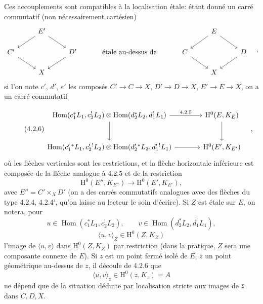 \documentclass[11pt]{article}
\renewcommand{\H}{\mathrm{H}}
\DeclareMathOperator{\Hom}{Hom}
\providecommand{\Hom}{\operatorname{Hom}}
\providecommand{\Hom}{\operatorname{Hom}}
\begin{document}
Ces accouplements sont compatibles à la localisation étale: étant donné un carré commutatif (non nécessairement cartésien)
\[
\begin{tikzcd}[column sep=2.5em,row sep=1.5em]
& E' \arrow[dl] \arrow[dr] & && & E \arrow[dl] \arrow[dr] & \\
C' \arrow[dr] && D' \arrow[dl] & \text{ étale au-dessus de } & C \arrow[dr] && D \arrow[dl] \\
& X &&&& X &
\end{tikzcd}\quad ,
\]
si l'on note $c'$, $d'$, $e'$ les composés $C'\to C\to X$, $D'\to D\to X$, $E'\to E\to X$, on a un carré commutatif


\begin{equation}
\tag{4.2.6}
\begin{tikzcd}[column sep=large,row sep=large]
\Hom(c_1^*L_1,c_2^!L_2)\otimes\Hom(d_2^*L_2,d_1^!L_1)
  \arrow[r,"4.2.5"] \arrow[d] &
\H^0(E,K_E)\arrow[d] \\
\Hom(c_1'{}^*L_1,c_2'{}^!L_2)\otimes\Hom(d_2'{}^*L_2,d_1'{}^!L_1)
  \arrow[r] &
\H^0(E',K_{E'})
\end{tikzcd}\quad,
\end{equation}
où les
flèches verticales sont les restrictions, et la flèche horizontale inférieure est composée de la flèche analogue à 4.2.5 et de la restriction
\[
\H^0(E'',K_{E''})\longrightarrow \H^0(E',K_{E'}),
\]
avec $E''=C'\times_{X}D'$ (on a des carrés commutatifs analogues avec des flèches du type 4.2.4, 4.2.4', qu'on laisse au lecteur le soin d'écrire). Si $Z$ est étale sur $E$, on notera, pour
\[
u\in\Hom(c_1^*L_1,c_2^!L_2),\qquad
v\in\Hom(d_2^*L_2,d_1^!L_1),
\]
\begin{equation}
\tag{4.2.7}
\langle u,v\rangle_Z\in \H^0(Z,K_Z)
\end{equation}
l'image de $\langle u,v\rangle$ dans $\H^0(Z,K_Z)$ par restriction (dans la pratique, $Z$ sera une composante connexe de $E$). Si $z$ est un point fermé isolé de $E$, $\bar z$ un point géométrique au-dessus de $z$, il découle de 4.2.6 que
\[
\langle u,v\rangle_z\in \H^0(z,K_z)=A
\]
ne dépend que de la situation déduite par localisation stricte aux images de $\bar z$ dans $C,D,X$.
\end{document}
